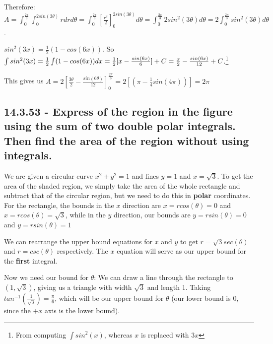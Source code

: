 \documentclass{article}
\begin{document}
\par\noindent\Large Therefore: $A = \int_{0}^{\frac{2\pi}{3}}\int_{0}^{2sin(3\theta)}rdrd\theta = \int_{0}^{\frac{2\pi}{3}}[\frac{r^{2}}{2}]_{0}^{2sin(3\theta)}d\theta = \int_{0}^{\frac{2\pi}{3}}2sin^{2}(3\theta)d\theta = 2\int_{0}^{\frac{2\pi}{3}}sin^{2}(3\theta)d\theta$.

\par\noindent\Large $sin^{2}(3x) = \frac{1}{2}(1 - cos(6x))$.  So $\int sin^{2}(3x) = \frac{1}{2}\int(1 - cos(6x))dx = \linebreak\frac{1}{2}[x - \frac{sin(6x)}{6}] + C = \frac{x}{2} - \frac{sin(6x)}{12} + C$.\footnote{From computing $\int sin^{2}(x)$, whereas $x$ is replaced with $3x$}

\par\noindent\Large This gives us $A = 2[\frac{3\theta}{2} - \frac{sin(6\theta)}{12}]_{0}^{\frac{2\pi}{3}} = 2[(\pi - \frac{1}{4}sin(4\pi))] = 2\pi$

\subsection{14.3.53 - Express of the region in the figure using the sum of two double polar integrals.  Then find the area of the region without using integrals.}

\par\noindent\large We are given a circular curve $x^{2} + y^{2} = 1$ and lines $y = 1$ and $x = \sqrt{3}$.  To get the area of the shaded region, we simply take the area of the whole rectangle and subtract that of the circular region, but we need to do this in \textbf{polar} coordinates.  For the rectangle, the bounds in the $x$ direction are $x = rcos(\theta) = 0$ and $x = rcos(\theta) = \sqrt{3}$, while in the $y$ direction, our bounds are $y = rsin(\theta) = 0$ and $y = rsin(\theta) = 1$

\par\noindent\large We can rearrange the upper bound equations for $x$ and $y$ to get $r = \sqrt{3}sec(\theta)$ and $r = csc(\theta)$ respectively.  The $x$ equation will serve as our upper bound for the \textbf{first} integral.\vspace{0.25cm}

\par\noindent\large Now we need our bound for $\theta$: We can draw a line through the rectangle to $(1, \sqrt{3})$, giving us a triangle with width $\sqrt{3}$ and length $1$.  Taking $tan^{-1}(\frac{1}{\sqrt{3}}) = \frac{\pi}{6}$, which will be our upper bound for $\theta$ (our lower bound is $0$, since the $+x$ axis is the lower bound).\vspace{0.25cm}
\end{document}
